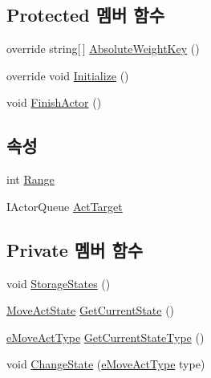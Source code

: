 \subsection*{Protected 멤버 함수}
\begin{DoxyCompactItemize}
\item 
override string\mbox{[}$\,$\mbox{]} \hyperlink{class_move_actor_a1039b1d985874bc3aace417e85bf6676}{Absolute\+Weight\+Key} ()
\item 
override void \hyperlink{class_move_actor_a5dadb0f5c892440b6a884da7ef56b538}{Initialize} ()
\item 
void \hyperlink{class_m_c_n_1_1_actor_ae86279ca7d290707cd010bc411f38966}{Finish\+Actor} ()
\end{DoxyCompactItemize}
\subsection*{속성}
\begin{DoxyCompactItemize}
\item 
int \hyperlink{class_move_actor_a4473f7867a074c8ca605220086c5d8fd}{Range}
\item 
I\+Actor\+Queue \hyperlink{class_m_c_n_1_1_actor_a1d809d2994dcccb6a8fcc665afa1ca6f}{Act\+Target}
\end{DoxyCompactItemize}
\subsection*{Private 멤버 함수}
\begin{DoxyCompactItemize}
\item 
void \hyperlink{class_move_actor_a34b9e1ec5019892f38a8d5087bd5c2fe}{Storage\+States} ()
\item 
\hyperlink{class_move_actor_1_1_move_act_state}{Move\+Act\+State} \hyperlink{class_move_actor_afb5993f5f72725ebd6e1bc58470e5621}{Get\+Current\+State} ()
\item 
\hyperlink{_move_actor_8cs_a1df5a2532cc7e6bde40a57d2dcbe23fe}{e\+Move\+Act\+Type} \hyperlink{class_move_actor_a91d32dcea30abc30c8e04641244e8c09}{Get\+Current\+State\+Type} ()
\item 
void \hyperlink{class_move_actor_a5f441e674d4ce71a460930e395f0966b}{Change\+State} (\hyperlink{_move_actor_8cs_a1df5a2532cc7e6bde40a57d2dcbe23fe}{e\+Move\+Act\+Type} type)
\end{DoxyCompactItemize}
